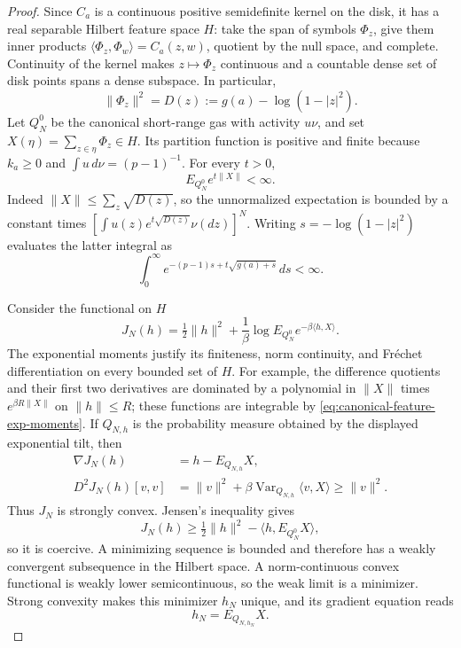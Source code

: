 \documentclass[11pt]{article}
\theoremstyle{remark}\newtheorem{remark}[theorem]{Remark}
\begin{document}
\begin{proof}
Since $C_a$ is a continuous positive semidefinite kernel on the disk,
it has a real separable Hilbert feature space $H$: take the span of
symbols $\Phi_z$, give them inner products
$\langle\Phi_z,\Phi_w\rangle=C_a(z,w)$, quotient by the null space,
and complete. Continuity of the kernel makes $z\mapsto\Phi_z$
continuous and a countable dense set of disk points spans a dense
subspace. In particular,
\[
 \|\Phi_z\|^2=D(z):=g(a)-\log(1-|z|^2).
\]
Let $Q_N^0$ be the canonical short-range gas with activity $u\nu$,
and set $X(\eta)=\sum_{z\in\eta}\Phi_z\in H$.
Its partition function is positive and finite because $k_a\ge0$ and
$\int u\,d\nu=(p-1)^{-1}$. For every $t>0$,
\begin{equation}\label{eq:canonical-feature-exp-moments}
 E_{Q_N^0}e^{t\|X\|}<\infty.
\end{equation}
Indeed $\|X\|\le\sum_z\sqrt{D(z)}$, so the unnormalized expectation
is bounded by a constant times
$[\int u(z)e^{t\sqrt{D(z)}}\nu(dz)]^N$. Writing
$s=-\log(1-|z|^2)$ evaluates the latter integral as
\[
 \int_0^\infty
 e^{-(p-1)s+t\sqrt{g(a)+s}}\,ds<\infty.
\]

Consider the functional on $H$
\[
 J_N(h)=\tfrac12\|h\|^2+\frac1\beta
       \log E_{Q_N^0}e^{-\beta\langle h,X\rangle}.
\]
The exponential moments justify its finiteness, norm continuity, and
Fr\'echet differentiation on every bounded set of $H$. For example,
the difference quotients and their first two derivatives are dominated
by a polynomial in $\|X\|$ times $e^{\beta R\|X\|}$ on
$\|h\|\le R$; these functions are integrable by
\eqref{eq:canonical-feature-exp-moments}.
If $Q_{N,h}$ is the probability measure obtained by the displayed
exponential tilt, then
\begin{align*}
 \nabla J_N(h)&=h-E_{Q_{N,h}}X,\\
 D^2J_N(h)[v,v]&=\|v\|^2+
       \beta\operatorname{Var}_{Q_{N,h}}\langle v,X\rangle
       \ge\|v\|^2.
\end{align*}
Thus $J_N$ is strongly convex. Jensen's inequality gives
\[
 J_N(h)\ge\tfrac12\|h\|^2-
               \langle h,E_{Q_N^0}X\rangle,
\]
so it is coercive. A minimizing sequence is bounded and therefore has
a weakly convergent subsequence in the Hilbert space. A norm-continuous
convex functional is weakly lower semicontinuous, so the weak limit is
a minimizer. Strong convexity makes this minimizer $h_N$ unique, and
its gradient equation reads
\begin{equation}\label{eq:canonical-feature-fixed-point}
 h_N=E_{Q_{N,h_N}}X.
\end{equation}


\end{proof}
\end{document}
